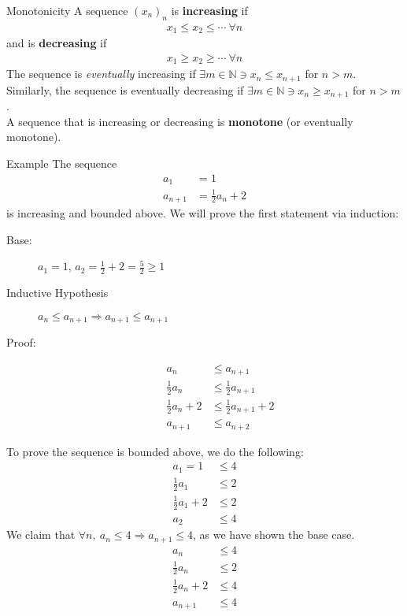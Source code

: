 \documentclass[8pt]{extarticle}
\newcommand{\N}{\mathbb{N}}
\begin{document}
  \begin{problem}{Monotonicity}
    A sequence $(x_n)_n$ is \textbf{increasing} if
    \begin{align*}
      x_1 \leq x_2 \leq \cdots~\forall n
    \end{align*}
    and is \textbf{decreasing} if
    \begin{align*}
      x_1 \geq x_2 \geq \cdots~\forall n
    \end{align*}
    The sequence is \textit{eventually} increasing if $\exists m\in \N \ni x_n \leq x_{n+1}$ for $n > m$.\\

    Similarly, the sequence is eventually decreasing if $\exists m\in\N \ni x_n \geq x_{n+1}$ for $n > m$.\\

    A sequence that is increasing or decreasing is \textbf{monotone} (or eventually monotone).\\

    \begin{problem}{Example}
      The sequence
      \begin{align*}
        a_1 &= 1\\
        a_{n+1} &= \frac{1}{2}a_n + 2
      \end{align*}
      is increasing and bounded above.
      \tcblower
      We will prove the first statement via induction:
      \begin{description}
        \item[Base:] $a_1 = 1$, $a_2 = \frac{1}{2} + 2 = \frac{5}{2} \geq 1$
        \item[Inductive Hypothesis] $a_n \leq a_{n+1} \Rightarrow a_{n+1} \leq a_{n+1}$
        \item[Proof:]
          \begin{align*}
            a_{n} &\leq a_{n+1}\\
            \frac{1}{2}a_n &\leq \frac{1}{2}a_{n+1}\\
            \frac{1}{2}a_n + 2 &\leq \frac{1}{2}a_{n+1} + 2\\
            a_{n+1} &\leq a_{n+2}
          \end{align*}
      \end{description}
      To prove the sequence is bounded above, we do the following:
      \begin{align*}
        a_1 = 1 &\leq 4\\
        \frac{1}{2}a_1 &\leq 2\\
        \frac{1}{2}a_1 + 2 &\leq 2\\
        a_{2} &\leq 4
      \end{align*}
      We claim that $\forall n,~a_n \leq 4 \Rightarrow a_{n+1} \leq 4$, as we have shown the base case.
      \begin{align*}
        a_{n} &\leq 4\\
        \frac{1}{2}a_n &\leq 2\\
        \frac{1}{2}a_n + 2 &\leq 4\\
        a_{n+1} &\leq 4
      \end{align*}
    \end{problem}
  \end{problem}
\end{document}
